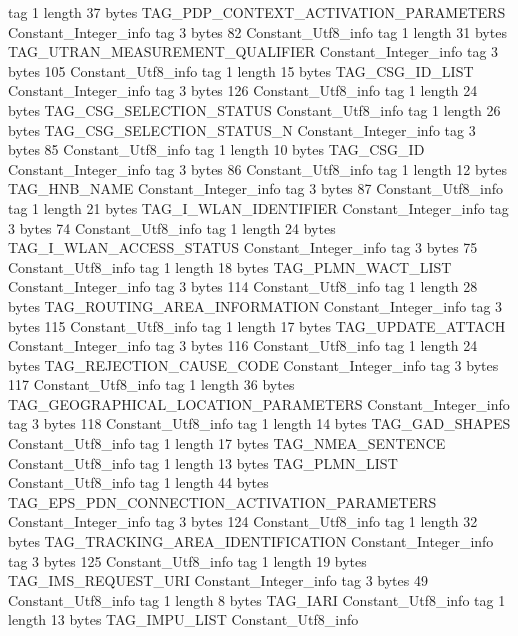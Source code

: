 {{{			tag	1
			length	37
			bytes	TAG_PDP_CONTEXT_ACTIVATION_PARAMETERS
		}
		Constant_Integer_info {
			tag	3
			bytes	82
		}
		Constant_Utf8_info {
			tag	1
			length	31
			bytes	TAG_UTRAN_MEASUREMENT_QUALIFIER
		}
		Constant_Integer_info {
			tag	3
			bytes	105
		}
		Constant_Utf8_info {
			tag	1
			length	15
			bytes	TAG_CSG_ID_LIST
		}
		Constant_Integer_info {
			tag	3
			bytes	126
		}
		Constant_Utf8_info {
			tag	1
			length	24
			bytes	TAG_CSG_SELECTION_STATUS
		}
		Constant_Utf8_info {
			tag	1
			length	26
			bytes	TAG_CSG_SELECTION_STATUS_N
		}
		Constant_Integer_info {
			tag	3
			bytes	85
		}
		Constant_Utf8_info {
			tag	1
			length	10
			bytes	TAG_CSG_ID
		}
		Constant_Integer_info {
			tag	3
			bytes	86
		}
		Constant_Utf8_info {
			tag	1
			length	12
			bytes	TAG_HNB_NAME
		}
		Constant_Integer_info {
			tag	3
			bytes	87
		}
		Constant_Utf8_info {
			tag	1
			length	21
			bytes	TAG_I_WLAN_IDENTIFIER
		}
		Constant_Integer_info {
			tag	3
			bytes	74
		}
		Constant_Utf8_info {
			tag	1
			length	24
			bytes	TAG_I_WLAN_ACCESS_STATUS
		}
		Constant_Integer_info {
			tag	3
			bytes	75
		}
		Constant_Utf8_info {
			tag	1
			length	18
			bytes	TAG_PLMN_WACT_LIST
		}
		Constant_Integer_info {
			tag	3
			bytes	114
		}
		Constant_Utf8_info {
			tag	1
			length	28
			bytes	TAG_ROUTING_AREA_INFORMATION
		}
		Constant_Integer_info {
			tag	3
			bytes	115
		}
		Constant_Utf8_info {
			tag	1
			length	17
			bytes	TAG_UPDATE_ATTACH
		}
		Constant_Integer_info {
			tag	3
			bytes	116
		}
		Constant_Utf8_info {
			tag	1
			length	24
			bytes	TAG_REJECTION_CAUSE_CODE
		}
		Constant_Integer_info {
			tag	3
			bytes	117
		}
		Constant_Utf8_info {
			tag	1
			length	36
			bytes	TAG_GEOGRAPHICAL_LOCATION_PARAMETERS
		}
		Constant_Integer_info {
			tag	3
			bytes	118
		}
		Constant_Utf8_info {
			tag	1
			length	14
			bytes	TAG_GAD_SHAPES
		}
		Constant_Utf8_info {
			tag	1
			length	17
			bytes	TAG_NMEA_SENTENCE
		}
		Constant_Utf8_info {
			tag	1
			length	13
			bytes	TAG_PLMN_LIST
		}
		Constant_Utf8_info {
			tag	1
			length	44
			bytes	TAG_EPS_PDN_CONNECTION_ACTIVATION_PARAMETERS
		}
		Constant_Integer_info {
			tag	3
			bytes	124
		}
		Constant_Utf8_info {
			tag	1
			length	32
			bytes	TAG_TRACKING_AREA_IDENTIFICATION
		}
		Constant_Integer_info {
			tag	3
			bytes	125
		}
		Constant_Utf8_info {
			tag	1
			length	19
			bytes	TAG_IMS_REQUEST_URI
		}
		Constant_Integer_info {
			tag	3
			bytes	49
		}
		Constant_Utf8_info {
			tag	1
			length	8
			bytes	TAG_IARI
		}
		Constant_Utf8_info {
			tag	1
			length	13
			bytes	TAG_IMPU_LIST
		}
		Constant_Utf8_info {
}}}
